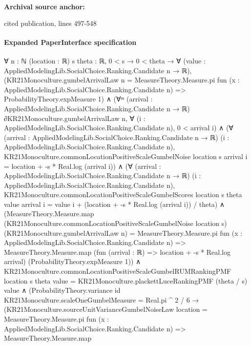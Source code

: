 \documentclass[10pt]{article}
\begin{document}
\textbf{Archival source anchor:} {\footnotesize\raggedright cited publication, lines 497-\allowbreak{}548\par}
\paragraph{Expanded PaperInterface specification}
\begin{ReviewVerbatim}
∀ {n : ℕ} (location : ℝ) {s theta : ℝ},
  0 < s →
    0 < theta →
      ∀ (value : AppliedModelingLib.SocialChoice.Ranking.Candidate n → ℝ),
        (KR21Monoculture.gumbelArrivalLaw n =
            MeasureTheory.Measure.pi fun (x : AppliedModelingLib.SocialChoice.Ranking.Candidate n) =>
              ProbabilityTheory.expMeasure 1) ∧
          (∀ᵐ (arrival : AppliedModelingLib.SocialChoice.Ranking.Candidate n → ℝ) ∂KR21Monoculture.gumbelArrivalLaw n,
              ∀ (i : AppliedModelingLib.SocialChoice.Ranking.Candidate n), 0 < arrival i) ∧
            (∀ (arrival : AppliedModelingLib.SocialChoice.Ranking.Candidate n → ℝ)
                (i : AppliedModelingLib.SocialChoice.Ranking.Candidate n),
                KR21Monoculture.commonLocationPositiveScaleGumbelNoise location s arrival i =
                  location + -s * Real.log (arrival i)) ∧
              (∀ (arrival : AppliedModelingLib.SocialChoice.Ranking.Candidate n → ℝ)
                  (i : AppliedModelingLib.SocialChoice.Ranking.Candidate n),
                  KR21Monoculture.commonLocationPositiveScaleGumbelScores location s theta value arrival i =
                    value i + (location + -s * Real.log (arrival i)) / theta) ∧
                (MeasureTheory.Measure.map (KR21Monoculture.commonLocationPositiveScaleGumbelNoise location s)
                      (KR21Monoculture.gumbelArrivalLaw n) =
                    MeasureTheory.Measure.pi fun (x : AppliedModelingLib.SocialChoice.Ranking.Candidate n) =>
                      MeasureTheory.Measure.map (fun (arrival : ℝ) => location + -s * Real.log arrival)
                        (ProbabilityTheory.expMeasure 1)) ∧
                  KR21Monoculture.commonLocationPositiveScaleGumbelRUMRankingPMF location s theta value =
                      KR21Monoculture.plackettLuceRankingPMF (theta / s) value ∧
                    (ProbabilityTheory.variance id KR21Monoculture.scaleOneGumbelMeasure = Real.pi ^ 2 / 6 →
                      (KR21Monoculture.sourceUnitVarianceGumbelNoiseLaw location =
                          MeasureTheory.Measure.pi fun (x : AppliedModelingLib.SocialChoice.Ranking.Candidate n) =>
                            MeasureTheory.Measure.map

\end{ReviewVerbatim}
\end{document}

